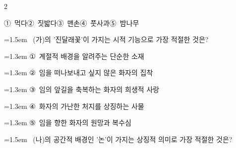 \documentclass[10pt, a4paper]{article}
\begin{document}
\begin{multicols}{2}
\begin{minipage}{\columnwidth}
\vspace{0.5mm}
\noindent
\mbox{①~먹다}\hspace{1em}\mbox{②~짓밟다}\hspace{1em}\mbox{③~맨손}\hspace{1em}\mbox{④~풋사과}\hspace{1em}\mbox{⑤~밤나무}

\vspace{4mm}
\end{minipage}
\par

\noindent\begin{minipage}{\columnwidth}
\vspace{2mm}
{\hangindent=1.5em  ~(가)의 '진달래꽃'이 가지는 시적 기능으로 가장 적절한 것은?\par}

\vspace{0.5mm}
{\hangindent=1.3em  \noindent\hspace{0.3em}①~계절적 배경을 알려주는 단순한 소재\par}
{\hangindent=1.3em  \noindent\hspace{0.3em}②~임을 떠나보내고 싶지 않은 화자의 집착\par}
{\hangindent=1.3em  \noindent\hspace{0.3em}③~임의 앞길을 축복하는 화자의 희생적 사랑\par}
{\hangindent=1.3em  \noindent\hspace{0.3em}④~화자의 가난한 처지를 상징하는 사물\par}
{\hangindent=1.3em  \noindent\hspace{0.3em}⑤~임을 향한 화자의 원망과 복수심\par}
\vspace{4mm}
\end{minipage}
\par

\noindent\begin{minipage}{\columnwidth}
\vspace{2mm}
{\hangindent=1.5em  ~(나)의 공간적 배경인 '논'이 가지는 상징적 의미로 가장 적절한 것은?\par}


\end{minipage}
\end{multicols}
\end{document}
